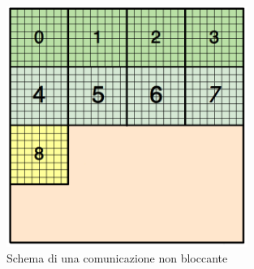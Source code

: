 \begin{figure}[H]
	\centering
	\includegraphics[width=0.7\textwidth]{immagini/block_on_grid.png}
	\caption{Schema di una comunicazione non bloccante}
	\label{fig:mpi_non_block_comm}
\end{figure}
